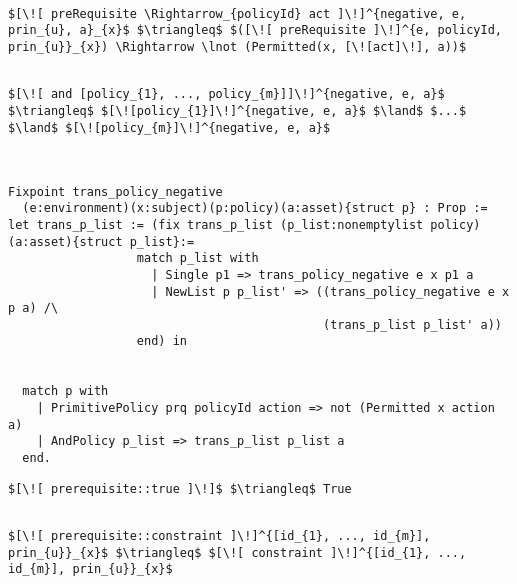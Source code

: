 \lstset{mathescape, language=AST}  
\begin{lstlisting}[frame=single, caption={Negative Policy Translation {$\colon$} Single policy},label={lst:transpolicynegativeSingle}]

$[\![ preRequisite \Rightarrow_{policyId} act ]\!]^{negative, e, prin_{u}, a}_{x}$ $\triangleq$ $([\![ preRequisite ]\!]^{e, policyId, prin_{u}}_{x}) \Rightarrow \lnot (Permitted(x, [\![act]\!], a))$

\end{lstlisting}
\lstset{mathescape, language=AST}  
\begin{lstlisting}[frame=single, caption={Negative Policy Translation {$\colon$} List of policies},label={lst:transpolicynegativeListOfPolicies}]

$[\![ and [policy_{1}, ..., policy_{m}]]\!]^{negative, e, a}$ $\triangleq$ $[\![policy_{1}]\!]^{negative, e, a}$ $\land$ $...$ $\land$ $[\![policy_{m}]\!]^{negative, e, a}$


\end{lstlisting}

\begin{lstlisting}

Fixpoint trans_policy_negative
  (e:environment)(x:subject)(p:policy)(a:asset){struct p} : Prop :=
let trans_p_list := (fix trans_p_list (p_list:nonemptylist policy)(a:asset){struct p_list}:=
                  match p_list with
                    | Single p1 => trans_policy_negative e x p1 a
                    | NewList p p_list' => ((trans_policy_negative e x p a) /\ 
                                            (trans_p_list p_list' a))
                  end) in


  match p with
    | PrimitivePolicy prq policyId action => not (Permitted x action a)
    | AndPolicy p_list => trans_p_list p_list a
  end.

\end{lstlisting}

\lstset{mathescape, language=AST}  
\begin{lstlisting}[frame=single, caption={Prerequisite Translation {$\colon$} Always True Prerequisite},label={lst:transpreRequisiteTruePrq}]
	$[\![ prerequisite::true ]\!]$ $\triangleq$ True
\end{lstlisting}

\lstset{mathescape, language=AST}  
\begin{lstlisting}[frame=single, caption={Prerequisite Translation {$\colon$} Constraint},label={lst:transpreRequisiteConstraint}]

$[\![ prerequisite::constraint ]\!]^{[id_{1}, ..., id_{m}], prin_{u}}_{x}$ $\triangleq$ $[\![ constraint ]\!]^{[id_{1}, ..., id_{m}], prin_{u}}_{x}$ 
\end{lstlisting}

